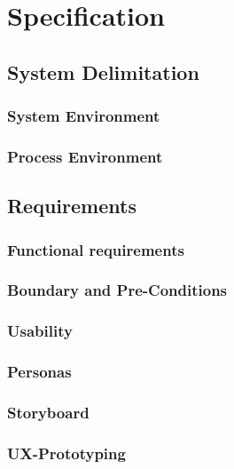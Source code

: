 \section{Specification}

\subsection{System Delimitation}

\subsubsection{System Environment}

\subsubsection{Process Environment}

\subsection{Requirements}

\subsubsection{Functional requirements}

\subsubsection{Boundary and Pre-Conditions}

\subsubsection{Usability}

\subsubsection{Personas}

\subsubsection{Storyboard}

\subsubsection{UX-Prototyping}
